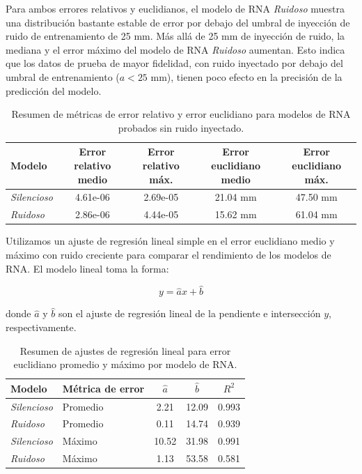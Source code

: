 \documentclass[12pt,a4paper]{article}
\begin{document}
Para ambos errores relativos y euclidianos, el modelo de RNA \textit{Ruidoso} muestra una distribución bastante estable de error por debajo del umbral de inyección de ruido de entrenamiento de 25 mm. Más allá de 25 mm de inyección de ruido, la mediana y el error máximo del modelo de RNA \textit{Ruidoso} aumentan. Esto indica que los datos de prueba de mayor fidelidad, con ruido inyectado por debajo del umbral de entrenamiento ($a < 25$ mm), tienen poco efecto en la precisión de la predicción del modelo.

\begin{table}[H]
\centering
\caption{Resumen de métricas de error relativo y error euclidiano para modelos de RNA probados sin ruido inyectado.}
\label{tab:errores}
\begin{tabular}{@{}lcccc@{}}
\toprule
Modelo & Error relativo medio & Error relativo máx. & Error euclidiano medio & Error euclidiano máx. \\
\midrule
\textit{Silencioso} & 4.61e-06 & 2.69e-05 & 21.04 mm & 47.50 mm \\
\textit{Ruidoso} & 2.86e-06 & 4.44e-05 & 15.62 mm & 61.04 mm \\
\bottomrule
\end{tabular}
\end{table}

Utilizamos un ajuste de regresión lineal simple en el error euclidiano medio y máximo con ruido creciente para comparar el rendimiento de los modelos de RNA. El modelo lineal toma la forma:

\begin{equation}
y = \hat{a}x + \hat{b}
\end{equation}

donde $\hat{a}$ y $\hat{b}$ son el ajuste de regresión lineal de la pendiente e intersección $y$, respectivamente.

\begin{table}[H]
\centering
\caption{Resumen de ajustes de regresión lineal para error euclidiano promedio y máximo por modelo de RNA.}
\label{tab:regresion}
\begin{tabular}{@{}llccc@{}}
\toprule
Modelo & Métrica de error & $\hat{a}$ & $\hat{b}$ & $R^2$ \\
\midrule
\textit{Silencioso} & Promedio & 2.21 & 12.09 & 0.993 \\
\textit{Ruidoso} & Promedio & 0.11 & 14.74 & 0.939 \\
\textit{Silencioso} & Máximo & 10.52 & 31.98 & 0.991 \\
\textit{Ruidoso} & Máximo & 1.13 & 53.58 & 0.581 \\
\bottomrule
\end{tabular}
\end{table}
\end{document}
